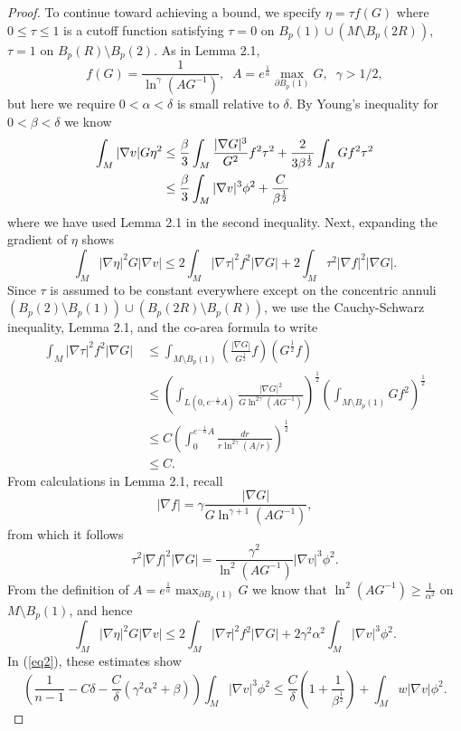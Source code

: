 \documentclass{amsart}
\theoremstyle{definition}
\theoremstyle{remark}
\numberwithin{equation}{section}
\begin{document}
\begin{proof}
To continue toward achieving a bound, we specify $\eta = \tau f(G)$ where $0\leq \tau \leq 1$ is a cutoff function satisfying $\tau = 0$ on $B_p(1)\cup (M\setminus B_p(2R)),$ $\tau = 1$ on $B_p(R)\setminus B_p(2)$. As in Lemma 2.1,
\begin{equation*}
f(G) = \frac{1}{\ln^\gamma(AG^{-1})}, \;\; A = e^{\frac{1}{\alpha}} \max_{\partial B_p(1)} G,\;\; \gamma>1/2,
\end{equation*}
but here we require $0<\alpha<\delta$ is small relative to $\delta$. By Young's inequality for $0<\beta<\delta$ we know
\begin{align}\label{eq3}
\int_M |\nabla v|G\eta ^2&\leq \frac{\beta}{3}\int_M\frac{|\nabla G|^3}{G^2}f^2\tau^2+\frac{2}{3\beta^\frac{1}{2}}\int_M Gf^2\tau^2 \notag\\
&\leq \frac{\beta}{3}\int_M |\nabla v|^3\phi^2+\frac{C}{\beta^\frac{1}{2}}
\end{align}
where we have used Lemma 2.1 in the second inequality. Next, expanding the gradient of $\eta$ shows
\begin{equation*}
\int_M |\nabla \eta|^2G|\nabla v|\leq 2\int_M|\nabla \tau|^2f^2|\nabla G|+2\int_M\tau^2|\nabla f|^2|\nabla G|.
\end{equation*}
Since $\tau$ is assumed to be constant everywhere except on the concentric annuli $(B_p(2)\setminus B_p(1))\cup (B_p(2R)\setminus B_p(R))$, we use the Cauchy-Schwarz inequality, Lemma 2.1, and the co-area formula to write
\begin{align*}
\int_M |\nabla \tau|^2f^2|\nabla G|\ 
&\leq \int_{M\setminus B_p(1)}\left(\frac{|\nabla G|}{G^\frac{1}{2}}f\right)\left(G^\frac{1}{2}f\right)\\
& \leq \left(\int_{L(0,e^{-\frac{1}{\alpha}}A)}\frac{|\nabla G|^2}{G\ln^{2\gamma}(AG^{-1})}\right)^\frac{1}{2}\left(\int_{M\setminus B_p(1)}Gf^2\right)^\frac{1}{2}\\
& \leq C\left(\int_0^{e^{-\frac{1}{\alpha}}A}\frac{dr}{r\ln^{2\gamma}(A/r)}\right)^\frac{1}{2}\\
& \leq C.
\end{align*}
From calculations in Lemma 2.1, recall
\begin{equation*}
|\nabla f| = \gamma \frac{|\nabla G|}{G\ln^{\gamma+1}(AG^{-1})},
\end{equation*}
from which it follows 
\begin{equation*}
\tau^2|\nabla f|^2|\nabla G| = \frac{\gamma^2}{\ln^2(AG^{-1})}|\nabla v|^3\phi^2.
\end{equation*}
From the definition of $A = e^\frac{1}{\alpha}\max_{\partial B_p(1)}G$ we know that $\ln^2(AG^{-1})\geq \frac{1}{\alpha^2}$ on $M\setminus B_p(1)$, and hence
\begin{equation*}
\int_M |\nabla \eta|^2G|\nabla v|\leq 2\int_M |\nabla\tau|^2f^2|\nabla G| +2\gamma^2\alpha^2\int_M |\nabla v|^3\phi^2 .
\end{equation*}
In (\ref{eq2}), these estimates show
\begin{equation*}
\left(\frac{1}{n-1}-C\delta-\frac{C}{\delta}\left(\gamma^2\alpha^2+\beta\right)\right)\int_M|\nabla v|^3\phi^2\leq \frac{C}{\delta}\left(1+\frac{1}{\beta^\frac{1}{2}}\right)+\int_M w|\nabla v| \phi^2.
\end{equation*}


\end{proof}
\end{document}
